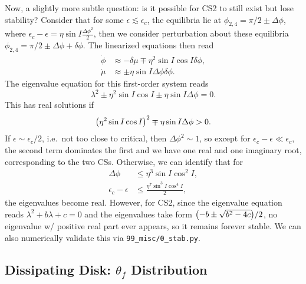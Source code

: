 \documentclass[11pt,
        usenames, %
        dvipsnames %
    ]{article}
\DeclarePairedDelimiter\p{\lparen}{\rparen}
\begin{document}
Now, a slightly more subtle question: is it possible for CS2 to still exist but
lose stability? Consider that for some $\epsilon\lesssim \epsilon_c$, the
equilibria lie at $\phi_{2, 4} = \pi/2 \pm \Delta \phi$, where $\epsilon_c -
\epsilon = \eta \sin I \frac{\Delta \phi^2}{2}$, then we consider perturbation
about these equilibria $\phi_{2, 4} = \pi/2 \pm \Delta \phi + \delta \phi$. The
linearized equations then read
\begin{subequations}
    \begin{align}
        \dot{\phi} &\approx -\delta \mu \mp \eta^2 \sin I \cos I \delta \phi,\\
        \dot{\mu} &\approx \pm\eta \sin I \Delta \phi \delta \phi.
    \end{align}
\end{subequations}
The eigenvalue equation for this first-order system reads
\begin{equation}
    \lambda^2 \pm \eta^2 \sin I \cos I \pm \eta \sin I \Delta \phi = 0.
\end{equation}
This has real solutions if
\begin{equation}
    \p*{\eta^2 \sin I \cos I}^2 \mp \eta \sin I \Delta \phi > 0.
\end{equation}
If $\epsilon \sim \epsilon_c / 2$, i.e.\ not too close to critical, then
$\Delta \phi^2 \sim 1$, so except for $\epsilon_c - \epsilon \ll \epsilon_c$,
the second term dominates the first and we have one real and one imaginary root,
corresponding to the two CSs. Otherwise, we can identify that for
\begin{align*}
    \Delta \phi &\leq \eta^3 \sin I \cos^2 I,\\
    \epsilon_c - \epsilon &\leq \frac{\eta^7 \sin^3 I \cos^4 I}{2},
\end{align*}
the eigenvalues become real. However, for CS2, since the eigenvalue equation
reads $\lambda^2 + b\lambda + c = 0$ and the eigenvalues take form $\p*{-b \pm
\sqrt{b^2 - 4c}}/2$, no eigenvalue w/ positive real part ever appears, so it
remains forever stable. We can also numerically validate this via
\lstinline{99_misc/0_stab.py}.

\subsection{Dissipating Disk: $\theta_f$ Distribution}
\end{document}
